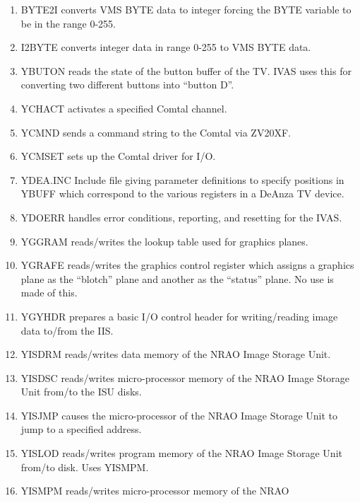 \begin{enumerate} %
\item BYTE2I converts VMS BYTE data to integer forcing the
BYTE variable to be in the range 0-255.
\item I2BYTE converts integer data in range 0-255 to VMS
BYTE data.
\item YBUTON reads the state of the button buffer of the TV.
IVAS uses this for converting two different buttons into ``button D''.
\item YCHACT activates a specified Comtal channel.
\item YCMND sends a command string to the Comtal via ZV20XF.
\item YCMSET sets up the Comtal driver for I/O.
\item YDEA.INC Include file giving parameter definitions
to specify positions in YBUFF which correspond to the various registers
in a DeAnza TV device.
\item YDOERR handles error conditions, reporting, and
resetting for the IVAS.
\item YGGRAM reads/writes the lookup table used for graphics
planes.
\item YGRAFE reads/writes the graphics control register
which assigns a
graphics plane as the ``blotch'' plane and another as the ``status''
plane.  No use is made of this.
\item YGYHDR prepares a basic I/O control header for
writing/reading image data to/from the IIS.
\item YISDRM reads/writes data memory of the NRAO Image
Storage Unit.
\item YISDSC reads/writes micro-processor memory of the
NRAO Image Storage Unit from/to the ISU disks.
\item YISJMP causes the micro-processor of the NRAO Image
Storage Unit to jump to a specified address.
\item YISLOD reads/writes program memory of the NRAO Image
Storage Unit from/to disk.  Uses YISMPM.
\item YISMPM reads/writes micro-processor memory of the NRAO

\end{enumerate}
